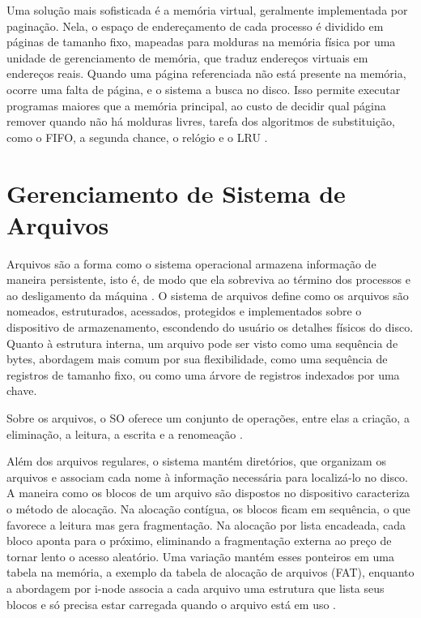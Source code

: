 \documentclass[
	12pt,				%
	openright,			%
	a4paper,			%
	english,			%
	french,				%
	spanish,			%
	brazilian,				%
	]{abntex2}
\begin{document}
Uma solução mais sofisticada é a memória virtual, geralmente implementada por paginação.
Nela, o espaço de endereçamento de cada processo é dividido em páginas de tamanho fixo,
mapeadas para molduras na memória física por uma unidade de gerenciamento de memória,
que traduz endereços virtuais em endereços reais. Quando uma página referenciada não
está presente na memória, ocorre uma falta de página, e o sistema a busca no disco. Isso
permite executar programas maiores que a memória principal, ao custo de decidir qual
página remover quando não há molduras livres, tarefa dos algoritmos de substituição, como
o FIFO, a segunda chance, o relógio e o LRU \cite{tanenbaum2016}.

\section{Gerenciamento de Sistema de Arquivos}
Arquivos são a forma como o sistema operacional armazena informação de maneira
persistente, isto é, de modo que ela sobreviva ao término dos processos e ao desligamento
da máquina \cite{tanenbaum2016}. O sistema de arquivos define como os arquivos são
nomeados, estruturados, acessados, protegidos e implementados sobre o dispositivo de
armazenamento, escondendo do usuário os detalhes físicos do disco. Quanto à estrutura
interna, um arquivo pode ser visto como uma sequência de bytes, abordagem mais comum
por sua flexibilidade, como uma sequência de registros de tamanho fixo, ou como uma
árvore de registros indexados por uma chave.

Sobre os arquivos, o SO oferece um conjunto de operações, entre elas a criação, a
eliminação, a leitura, a escrita e a renomeação \cite{tanenbaum2016}.

Além dos arquivos regulares, o sistema mantém diretórios, que organizam os arquivos e
associam cada nome à informação necessária para localizá-lo no disco. A maneira como os
blocos de um arquivo são dispostos no dispositivo caracteriza o método de alocação. Na
alocação contígua, os blocos ficam em sequência, o que favorece a leitura mas gera
fragmentação. Na alocação por lista encadeada, cada bloco aponta para o próximo,
eliminando a fragmentação externa ao preço de tornar lento o acesso aleatório. Uma
variação mantém esses ponteiros em uma tabela na memória, a exemplo da tabela de
alocação de arquivos (FAT), enquanto a abordagem por i-node associa a cada arquivo uma
estrutura que lista seus blocos e só precisa estar carregada quando o arquivo está em uso
\cite{silberschatz2015}.
\end{document}
